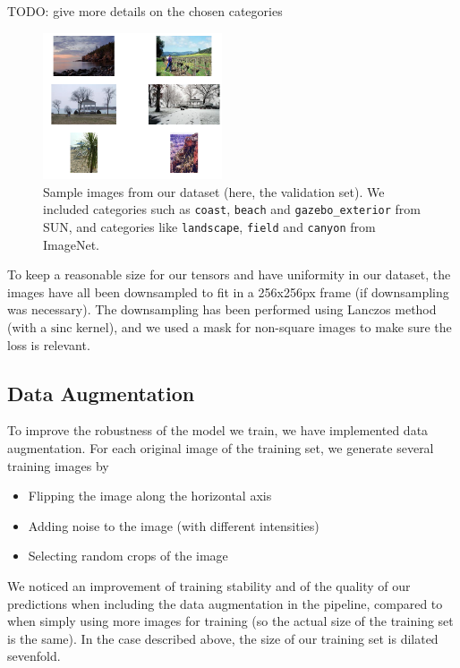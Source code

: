 \documentclass[10pt,twocolumn,letterpaper]{article}
\begin{document}
TODO: give more details on the chosen categories

\begin{figure}
\begin{center}
\includegraphics[width=200px]{sampletrain.png}
\caption{Sample images from our dataset (here, the validation set). We included categories such as \texttt{coast}, \texttt{beach} and \texttt{gazebo\_exterior} from SUN, and categories like \texttt{landscape}, \texttt{field} and \texttt{canyon} from ImageNet.}
\label{sampletrain}
\end{center}
\end{figure}

To keep a reasonable size for our tensors and have uniformity in our dataset, the images have all been downsampled to fit in a 256x256px frame (if downsampling was necessary). The downsampling has been performed using Lanczos method (with a $\text{sinc}$ kernel), and we used a mask for non-square images to make sure the loss is relevant.

\subsection{Data Augmentation}

To improve the robustness of the model we train, we have implemented data augmentation. For each original image of the training set, we generate several training images by
\begin{itemize}
\item Flipping the image along the horizontal axis
\item Adding noise to the image (with different intensities)
\item Selecting random crops of the image
\end{itemize}

We noticed an improvement of training stability and of the quality of our predictions when including the data augmentation in the pipeline, compared to when simply using more images for training (so the actual size of the training set is the same). In the case described above, the size of our training set is dilated sevenfold.
\end{document}
